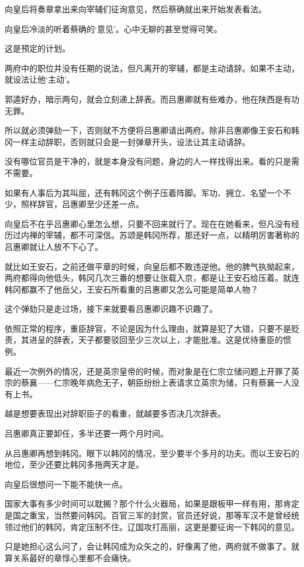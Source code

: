 向皇后将奏章拿出来向宰辅们征询意见，然后蔡确就出来开始发表看法。

向皇后冷淡的听着蔡确的‘意见’。心中无聊的甚至觉得可笑。

这是预定的计划。

两府中的职位并没有任期的说法，但凡离开的宰辅，都是主动请辞。如果不主动，就设法让他‘主动’。

郭逵好办，暗示两句，就会立刻递上辞表。而吕惠卿就有些难办，他在陕西是有功无罪。

所以就必须弹劾一下，否则就不方便将吕惠卿请出两府。除非吕惠卿像王安石和韩冈一样主动辞职，否则就只会是一封弹章开头，设法让其主动请辞。

没有哪位官员是干净的，就是本身没有问题，身边的人一样找得出来。看的只是需不需要。

如果有人事后为其叫屈，还有韩冈这个例子压着阵脚。军功、拥立、名望一个不少，照样辞官，吕惠卿至少还差一点。

向皇后不在乎吕惠卿心里怎么想，只要不回来就行了。现在在她看来，但凡没有经历过内禅的宰辅，都不可深信。苏颂是韩冈所荐，那还好一点，以精明厉害著称的吕惠卿就让人放不下心了。

就比如王安石，之前还做平章的时候，向皇后都不敢违逆他。他的脾气执拗起来，两府都得向他低头，韩冈几次三番的想要让张载入京，都是让王安石给压着。就连韩冈都赢不了他岳父，王安石所看重的吕惠卿又怎么可能是简单人物？

这个弹劾只是走过场，接下来就要看吕惠卿识趣不识趣了。

依照正常的程序，重臣辞官，不论是因为什么理由，就算是犯了大错，只要不是贬责，其进呈的辞表，天子都要驳回至少三次以上，才能批准。这是优待重臣的惯例。

最近一次例外的情况，还是英宗皇帝的时候，而对象是在仁宗立储问题上开罪了英宗的蔡襄——仁宗晚年病危无子，朝臣纷纷上表请求立英宗为储，只有蔡襄一人没有上书。

越是想要表现出对辞职臣子的看重，就越要多否决几次辞表。

吕惠卿真正要卸任，多半还要一两个月时间。

从吕惠卿再想到韩冈。眼下以韩冈的情况，至少要半个多月的功夫。而以王安石的地位，至少还要比韩冈多拖两天才是。

向皇后很想问一下能不能快一点。

国家大事有多少时间可以耽搁？那个什么火器局，如果是跟板甲一样有用，那肯定是国之重宝，当然要问韩冈。百官三军的封赏，官员还好说，那等军汉不是曾经统领过他们的韩冈，肯定压制不住。辽国攻打高丽，这更是要征询一下韩冈的意见。

只是她担心这么问了，会让韩冈成为众矢之的，好像离了他，两府就不做事了。就算关系最好的章惇心里都不会痛快。

